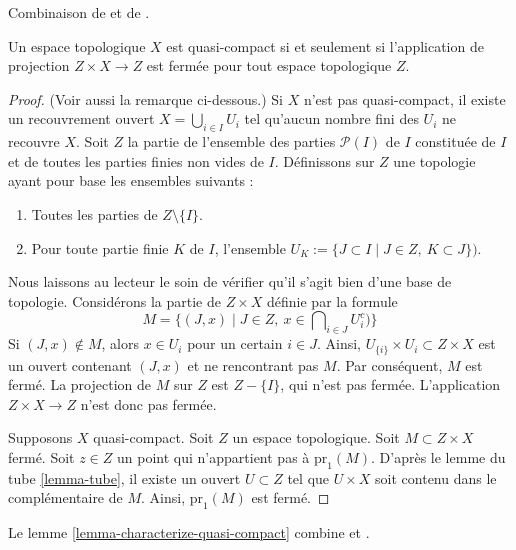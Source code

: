 \begin{lemma}
\label{lemma-characterize-quasi-compact}
\begin{reference}
Combinaison de
\cite[I, p. 75, Lemme 1]{Bourbaki} et de
\cite[I, p. 76, Corollaire 1]{Bourbaki}.
\end{reference}
Un espace topologique $X$ est quasi-compact si et seulement si l'application
de projection $Z \times X \to Z$ est fermée pour tout espace topologique $Z$.
\end{lemma}

\begin{proof}
(Voir aussi la remarque ci-dessous.)
Si $X$ n'est pas quasi-compact, il existe un recouvrement ouvert
$X = \bigcup_{i \in I} U_i$ tel qu'aucun nombre fini des $U_i$ ne recouvre
$X$.
Soit $Z$ la partie de l'ensemble des parties $\mathcal{P}(I)$ de $I$
constituée de $I$ et de toutes les parties finies non vides de $I$.
Définissons sur $Z$ une topologie ayant pour base les ensembles suivants :
\begin{enumerate}
\item Toutes les parties de $Z\setminus\{I\}$.
\item Pour toute partie finie $K$ de $I$, l'ensemble
$U_K := \{J\subset I \mid J \in Z, \ K\subset J \})$.
\end{enumerate}
Nous laissons au lecteur le soin de vérifier qu'il s'agit bien d'une base de
topologie. Considérons la partie de $Z \times X$ définie par la formule
$$
M = \{(J, x) \mid J \in Z, \ x \in \bigcap\nolimits_{i \in J} U_i^c)\}
$$
Si $(J, x) \not \in M$, alors $x \in U_i$ pour un certain $i \in J$.
Ainsi, $U_{\{i\}} \times U_i \subset Z \times X$ est un ouvert contenant
$(J, x)$ et ne rencontrant pas $M$. Par conséquent, $M$ est fermé. La
projection de $M$ sur $Z$ est $Z-\{I\}$, qui n'est pas fermée. L'application
$Z \times X \to Z$ n'est donc pas fermée.

\medskip\noindent
Supposons $X$ quasi-compact. Soit $Z$ un espace topologique.
Soit $M \subset  Z \times X$ fermé. Soit $z \in Z$ un point qui n'appartient
pas à $\text{pr}_1(M)$. D'après le lemme du tube \ref{lemma-tube}, il existe un
ouvert $U \subset Z$ tel que $U \times X$ soit contenu dans le complémentaire
de $M$. Ainsi, $\text{pr}_1(M)$ est fermé.
\end{proof}

\begin{remark}
\label{remark-lemma-literature}
Le lemme \ref{lemma-characterize-quasi-compact} combine
\cite[I, p. 75, Lemme 1]{Bourbaki} et
\cite[I, p. 76, Corollaire 1]{Bourbaki}.
\end{remark}

